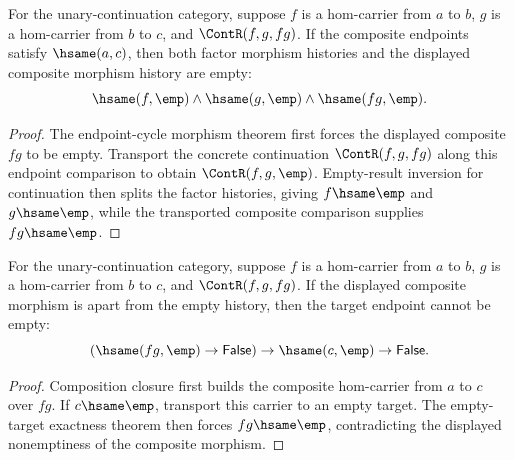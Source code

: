\begin{theorem}
\label{thm:category-hom-carrier-comp-endpoint-cycle-tails-empty}
For the unary-continuation category, suppose $f$ is a hom-carrier from $a$ to
$b$, $g$ is a hom-carrier from $b$ to $c$, and $\ContR(f,g,fg)$. If the
composite endpoints satisfy $\hsame(a,c)$, then both factor morphism histories
and the displayed composite morphism history are empty:
$$
\hsame(f,\emp)\wedge\hsame(g,\emp)\wedge\hsame(fg,\emp).
$$
\end{theorem}
\begin{proof}
The endpoint-cycle morphism theorem first forces the displayed composite
$fg$ to be empty. Transport the concrete continuation $\ContR(f,g,fg)$ along
this endpoint comparison to obtain $\ContR(f,g,\emp)$. Empty-result inversion
for continuation then splits the factor histories, giving $f\hsame\emp$ and
$g\hsame\emp$, while the transported composite comparison supplies
$fg\hsame\emp$.
\end{proof}

\begin{theorem}
\label{thm:category-hom-carrier-comp-morphism-nonempty-target-not-empty}
For the unary-continuation category, suppose $f$ is a hom-carrier from $a$ to
$b$, $g$ is a hom-carrier from $b$ to $c$, and $\ContR(f,g,fg)$. If the
displayed composite morphism is apart from the empty history, then the target
endpoint cannot be empty:
$$
(\hsame(fg,\emp)\to\mathsf{False})\to\hsame(c,\emp)\to\mathsf{False}.
$$
\end{theorem}
\begin{proof}
Composition closure first builds the composite hom-carrier from $a$ to $c$
over $fg$. If $c\hsame\emp$, transport this carrier to an empty target. The
empty-target exactness theorem then forces $fg\hsame\emp$, contradicting the
displayed nonemptiness of the composite morphism.
\end{proof}

